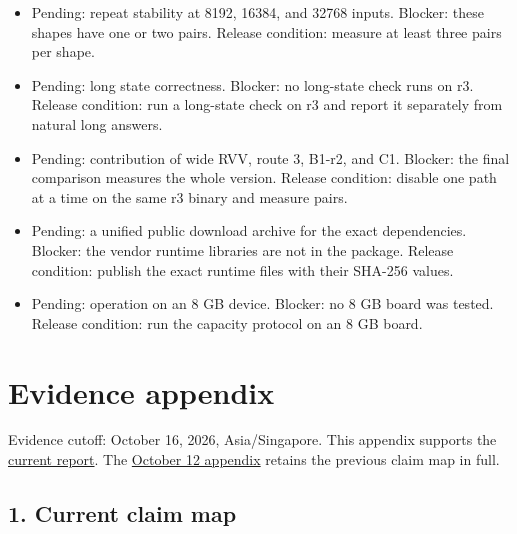 \documentclass[10pt,a4paper]{article}
\providecommand{\tightlist}{\setlength{\itemsep}{0pt}\setlength{\parskip}{0pt}}
\begin{document}
\begin{itemize}
\tightlist
\item
  Pending: repeat stability at 8192, 16384, and 32768 inputs. Blocker:
  these shapes have one or two pairs. Release condition: measure at
  least three pairs per shape.
\item
  Pending: long state correctness. Blocker: no long-state check runs on
  r3. Release condition: run a long-state check on r3 and report it
  separately from natural long answers.
\item
  Pending: contribution of wide RVV, route 3, B1-r2, and C1. Blocker:
  the final comparison measures the whole version. Release condition:
  disable one path at a time on the same r3 binary and measure pairs.
\item
  Pending: a unified public download archive for the exact dependencies.
  Blocker: the vendor runtime libraries are not in the package. Release
  condition: publish the exact runtime files with their SHA-256 values.
\item
  Pending: operation on an 8 GB device. Blocker: no 8 GB board was
  tested. Release condition: run the capacity protocol on an 8 GB board.
\end{itemize}

\clearpage

\hypertarget{evidence-appendix}{%
\section{Evidence appendix}\label{evidence-appendix}}

Evidence cutoff: October 16, 2026, Asia/Singapore. This appendix
supports the
\href{https://github.com/MoyaMryia/riscv-accl/blob/main/spacemit/reports/SUBMISSION-REPORT.md}{current
report}. The
\href{https://github.com/MoyaMryia/riscv-accl/blob/main/spacemit/reports/snapshots/2026-10-12/SUBMISSION-EVIDENCE.md}{October
12 appendix} retains the previous claim map in full.

\hypertarget{current-claim-map}{%
\subsection{1. Current claim map}\label{current-claim-map}}
\end{document}
